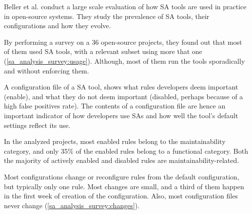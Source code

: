 \documentclass{article}
\begin{document}
 Beller et al. \cite{analysis_sa_usage} conduct a large scale evaluation of how SA tools are used in practice in open-source systems. They study the prevalence of SA tools, their configurations and how they evolve.

 By performing a survey on a 36 open-source projects, they found out that most of them used SA tools, with a relevant subset using more that one (\cref{sa_analysis_survey:usage}). Although, most of them run the tools sporadically and without enforcing them.

 A configuration file of a SA tool, shows what rules developers deem important (enable), and what they do not deem important (disabled, perhaps because of a high false positives rate). The contents of a configuration file are hence an important indicator of how developers use SAs and how well the tool’s default settings reflect its use.

 In the analyzed projects, most enabled rules belong to the maintainability category, and only 35\% of the enabled rules belong to a functional category. Both the majority of actively enabled and disabled rules are maintainability-related.

 Most configurations change or reconfigure rules from the default configuration, but typically only one rule. Most changes are small, and a third of them happen in the first week of creation of the configuration. Also, most configuration files never change (\cref{sa_analysis_survey:changes}).
\end{document}
